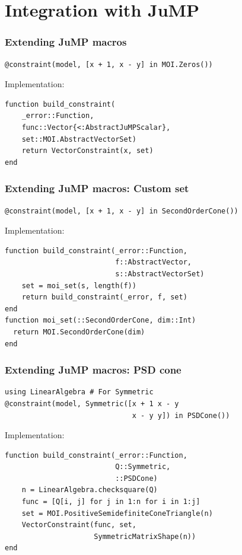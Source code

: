 \documentclass{beamer}
\begin{document}
\section{Integration with JuMP}

\begin{frame}[fragile]
  \frametitle{Extending JuMP macros}
\begin{verbatim}
@constraint(model, [x + 1, x - y] in MOI.Zeros())
\end{verbatim}
  Implementation:
\begin{verbatim}
function build_constraint(
    _error::Function,
    func::Vector{<:AbstractJuMPScalar},
    set::MOI.AbstractVectorSet)
    return VectorConstraint(x, set)
end
\end{verbatim}
\end{frame}

\begin{frame}[fragile]
  \frametitle{Extending JuMP macros: Custom set}
\begin{verbatim}
@constraint(model, [x + 1, x - y] in SecondOrderCone())
\end{verbatim}
  Implementation:
\begin{verbatim}
function build_constraint(_error::Function,
                          f::AbstractVector,
                          s::AbstractVectorSet)
    set = moi_set(s, length(f))
    return build_constraint(_error, f, set)
end
function moi_set(::SecondOrderCone, dim::Int)
  return MOI.SecondOrderCone(dim)
end
\end{verbatim}
\end{frame}

\begin{frame}[fragile]
  \frametitle{Extending JuMP macros: PSD cone}
\begin{verbatim}
using LinearAlgebra # For Symmetric
@constraint(model, Symmetric([x + 1 x - y
                              x - y y]) in PSDCone())
\end{verbatim}
  Implementation:
\begin{verbatim}
function build_constraint(_error::Function,
                          Q::Symmetric,
                          ::PSDCone)
    n = LinearAlgebra.checksquare(Q)
    func = [Q[i, j] for j in 1:n for i in 1:j]
    set = MOI.PositiveSemidefiniteConeTriangle(n)
    VectorConstraint(func, set,
                     SymmetricMatrixShape(n))
end
\end{verbatim}
\end{frame}
\end{document}
